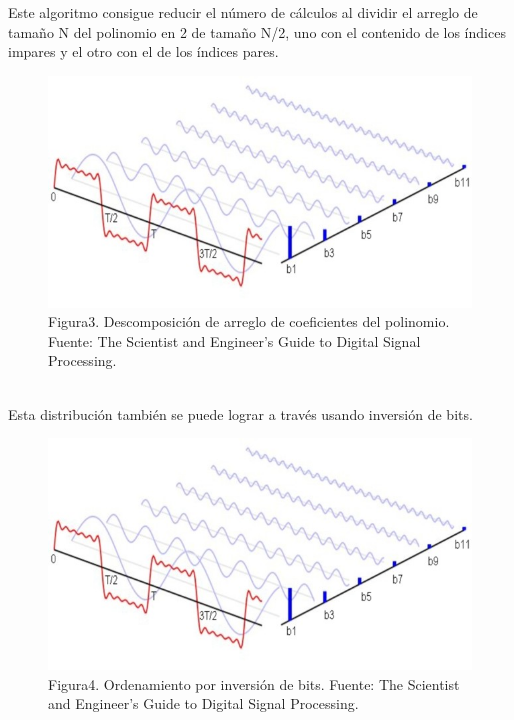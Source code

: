 \documentclass[review,1p]{elsarticle}
\begin{document}
Este algoritmo consigue reducir el número de cálculos al dividir el arreglo de tamaño N del polinomio en 2 de tamaño N/2, uno con el contenido de los índices impares y el otro con el de los índices pares. \\
\begin{figure}[h]
    \centering
    \includegraphics[scale=0.5]{Figuras/Serie-transformada.jpg}
    \\
    \small Figura3. Descomposición de arreglo de coeficientes del polinomio. Fuente: The Scientist and Engineer's Guide to Digital Signal Processing.\\
\end{figure}\\
Esta distribución también se puede lograr a través usando inversión de bits.\\
\begin{figure}[h]
    \centering
    \includegraphics[scale=0.5]{Figuras/Serie-transformada.jpg}
    \\
    \small Figura4. Ordenamiento por inversión de bits. Fuente: The Scientist and Engineer's Guide to Digital Signal Processing.\\
\end{figure}\\
\end{document}
